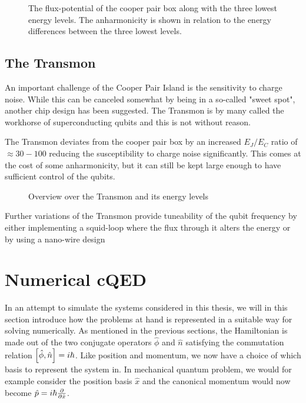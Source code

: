 \begin{figure}
    \centering
    \caption{The flux-potential of the cooper pair box along with the three lowest energy levels. The anharmonicity is shown in relation to the energy differences between the three lowest levels.}
    \label{fig:cooper_pair_box_energy_levels}
\end{figure}

\subsection{The Transmon}
An important challenge of the Cooper Pair Island is the sensitivity to charge noise. While this can be canceled somewhat by being in a so-called "sweet spot", another chip design has been suggested. The Transmon is by many called the workhorse of superconducting qubits and this is not without reason. 

The Transmon deviates from the cooper pair box by an increased $E_J/E_C$ ratio of $\approx 30-100$ reducing the susceptibility to charge noise significantly. This comes at the cost of some anharmonicity, but it can still be kept large enough to have sufficient control of the qubits.\cite{koch_charge_2007}

\begin{figure}
    \centering
    \caption{Overview over the Transmon and its energy levels}
    \label{fig:transmon_energy_levels}
\end{figure}

Further variations of the Transmon provide tuneability of the qubit frequency by either implementing a squid-loop where the flux through it alters the energy or by using a nano-wire design 



\section{Numerical cQED}
In an attempt to simulate the systems considered in this thesis, we will in this section introduce how the problems at hand is represented in a suitable way for solving numerically. As mentioned in the previous sections, the Hamiltonian is made out of the two conjugate operators $\hat{\phi}$ and $\hat{n}$ satisfying the commutation relation $\comm{\hat{\phi}}{\hat{n}} = i\hbar$. Like position and momentum, we now have a choice of which basis to represent the system in. In mechanical quantum problem, we would for example consider the position basis $\hat{x}$ and the canonical momentum would now become $\hat{p} = i \hbar \frac{\partial }{\partial \hat{x}}$. \cite{aumann_circuitq_2022}


